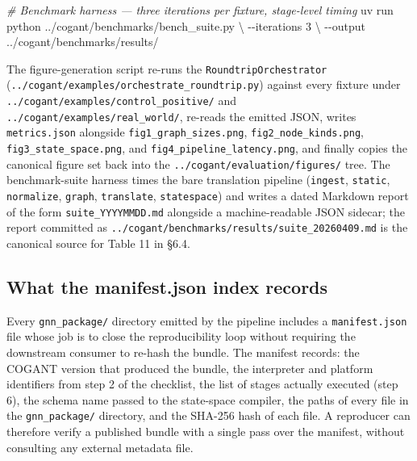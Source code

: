 \documentclass[
]{article}
\newenvironment{Shaded}{}{}
\newcommand{\AttributeTok}[1]{\textcolor[rgb]{0.49,0.56,0.16}{#1}}
\newcommand{\CommentTok}[1]{\textcolor[rgb]{0.38,0.63,0.69}{\textit{#1}}}
\newcommand{\DataTypeTok}[1]{\textcolor[rgb]{0.56,0.13,0.00}{#1}}
\newcommand{\ExtensionTok}[1]{#1}
\newcommand{\NormalTok}[1]{#1}
\begin{document}
\begin{Shaded}
\begin{Highlighting}[]
\CommentTok{\# Benchmark harness — three iterations per fixture, stage{-}level timing}
\ExtensionTok{uv}\NormalTok{ run python ../cogant/benchmarks/bench\_suite.py }\DataTypeTok{\textbackslash{}}
    \AttributeTok{{-}{-}iterations}\NormalTok{ 3 }\DataTypeTok{\textbackslash{}}
    \AttributeTok{{-}{-}output}\NormalTok{ ../cogant/benchmarks/results/}
\end{Highlighting}
\end{Shaded}

The figure-generation script re-runs the \texttt{RoundtripOrchestrator}
(\texttt{../cogant/examples/orchestrate\_roundtrip.py}) against every
fixture under \texttt{../cogant/examples/control\_positive/} and
\texttt{../cogant/examples/real\_world/}, re-reads the emitted JSON,
writes \texttt{metrics.json} alongside \texttt{fig1\_graph\_sizes.png},
\texttt{fig2\_node\_kinds.png}, \texttt{fig3\_state\_space.png}, and
\texttt{fig4\_pipeline\_latency.png}, and finally copies the canonical
figure set back into the \texttt{../cogant/evaluation/figures/} tree.
The benchmark-suite harness times the bare translation pipeline
(\texttt{ingest}, \texttt{static}, \texttt{normalize}, \texttt{graph},
\texttt{translate}, \texttt{statespace}) and writes a dated Markdown
report of the form \texttt{suite\_YYYYMMDD.md} alongside a
machine-readable JSON sidecar; the report committed as
\texttt{../cogant/benchmarks/results/suite\_20260409.md} is the
canonical source for Table 11 in §6.4.

\subsection{What the manifest.json index
records}\label{what-the-manifest.json-index-records}

Every \texttt{gnn\_package/} directory emitted by the pipeline includes
a \texttt{manifest.json} file whose job is to close the reproducibility
loop without requiring the downstream consumer to re-hash the bundle.
The manifest records: the COGANT version that produced the bundle, the
interpreter and platform identifiers from step 2 of the checklist, the
list of stages actually executed (step 6), the schema name passed to the
state-space compiler, the paths of every file in the
\texttt{gnn\_package/} directory, and the SHA-256 hash of each file. A
reproducer can therefore verify a published bundle with a single pass
over the manifest, without consulting any external metadata file.
\end{document}
